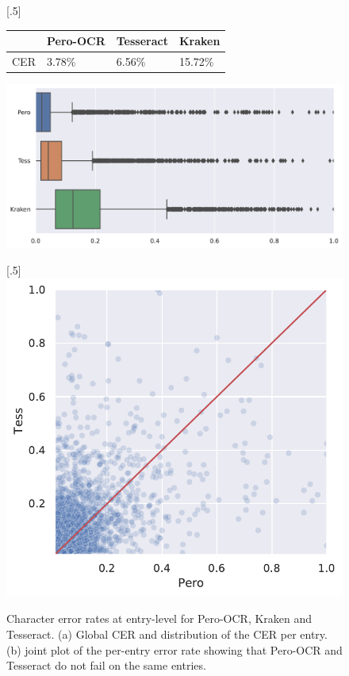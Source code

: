 \begin{figure}

\subcaptionbox{}[.5\linewidth]{
\begin{tabular}{rlll}
\toprule
 & Pero-OCR  & Tesseract & Kraken \\    
\midrule
CER & 3.78\% & 6.56\% & 15.72\% \\  
\bottomrule
\end{tabular}
\bigskip

\includegraphics[width=\linewidth]{images/ocr-eval-2.pdf}
\medskip
}
\subcaptionbox{}[.5\linewidth]{
\includegraphics[width=\linewidth]{images/ocr-eval-1.pdf}
}
\caption{Character error rates at entry-level for Pero-OCR, Kraken and Tesseract. (a) Global CER and distribution of the CER per entry. (b)
joint plot of the per-entry error rate showing that Pero-OCR and Tesseract do not fail on the same entries.}  
\label{fig.ocr-results}
\end{figure}

